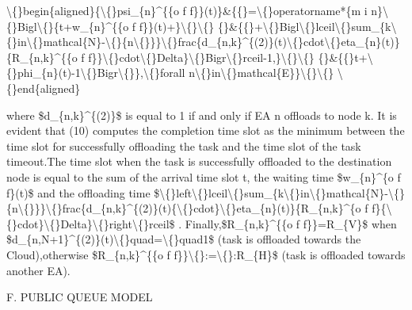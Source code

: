\documentclass{article}
\begin{document}
\textbackslash\{\}begin\{aligned\}\{\textbackslash\{\}psi\_\{n\}\textasciicircum{}\{\{o f f\}\}(t)\}\&\{\{\}=\textbackslash\{\}operatorname*\{m i n\}\textbackslash\{\}Bigl\textbackslash\{\}\{t+w\_\{n\}\textasciicircum{}\{\{o f f\}\}(t)+\}\textbackslash\{\}\textbackslash\{\} \{\}\&\{\{\}+\textbackslash\{\}Bigl\textbackslash\{\}lceil\textbackslash\{\}sum\_\{k\textbackslash\{\}in\textbackslash\{\}mathcal\{N\}-\textbackslash\{\}\{n\textbackslash\{\}\}\}\textbackslash\{\}frac\{d\_\{n,k\}\textasciicircum{}\{(2)\}(t)\textbackslash\{\}cdot\textbackslash\{\}eta\_\{n\}(t)\}\{R\_\{n,k\}\textasciicircum{}\{\{o f f\}\}\textbackslash\{\}cdot\textbackslash\{\}Delta\}\textbackslash\{\}Bigr\textbackslash\{\}rceil-1,\}\textbackslash\{\}\textbackslash\{\} \{\}\&\{\{\}t+\textbackslash\{\}phi\_\{n\}(t)-1\textbackslash\{\}Bigr\textbackslash\{\}\},\textbackslash\{\}forall n\textbackslash\{\}in\textbackslash\{\}mathcal\{E\}\}\textbackslash\{\}\textbackslash\{\} \textbackslash\{\}end\{aligned\}

where \$d\_\{n,k\}\textasciicircum{}\{(2)\}\$ is equal to 1 if and only if EA n offloads to node k. It is evident that (10) computes the completion time slot as the minimum between the time slot for successfully offloading the task and the time slot of the task timeout.The time slot when the task is successfully offloaded to the destination node is equal to the sum of the arrival time slot t, the waiting time \$w\_\{n\}\textasciicircum{}\{o f f\}(t)\$ and the offloading time \$\textbackslash\{\}left\textbackslash\{\}lceil\textbackslash\{\}sum\_\{k\textbackslash\{\}in\textbackslash\{\}mathcal\{N\}-\textbackslash\{\}\{n\textbackslash\{\}\}\}\textbackslash\{\}frac\{d\_\{n,k\}\textasciicircum{}\{(2)\}(t)\{\textbackslash\{\}cdot\}\textbackslash\{\}eta\_\{n\}(t)\}\{R\_\{n,k\}\textasciicircum{}\{o f f\}\{\textbackslash\{\}cdot\}\textbackslash\{\}Delta\}\textbackslash\{\}right\textbackslash\{\}rceil\$ . Finally,\$R\_\{n,k\}\textasciicircum{}\{\{o f f\}\}=R\_\{V\}\$ when \$d\_\{n,N+1\}\textasciicircum{}\{(2)\}(t)\textbackslash\{\}quad=\textbackslash\{\}quad1\$ (task is offloaded towards the Cloud),otherwise \$R\_\{n,k\}\textasciicircum{}\{\{o f f\}\}\textbackslash\{\}:=\textbackslash\{\}:R\_\{H\}\$ (task is offloaded towards another EA).

F. PUBLIC QUEUE MODEL
\end{document}
